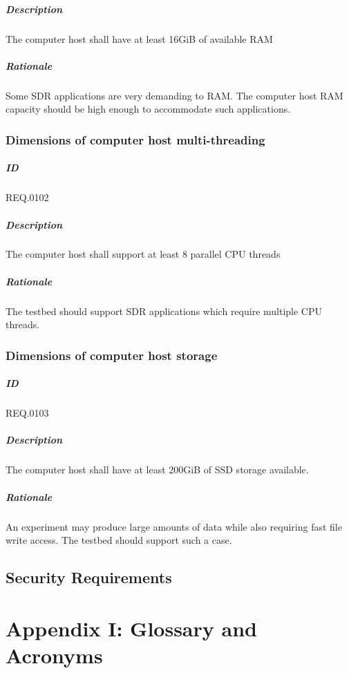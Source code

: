 \documentclass[english,titlepage,a4paper]{report}
\begin{document}
\paragraph{Description}
The computer host shall have at least 16GiB of available RAM
\paragraph{Rationale}
Some SDR applications are very demanding to RAM.
The computer host RAM capacity should be high enough to accommodate such applications.

\subsection{Dimensions of computer host multi-threading}
\paragraph{ID}
REQ.0102
\paragraph{Description}
The computer host shall support at least 8 parallel CPU threads
\paragraph{Rationale}
The testbed should support SDR applications which require multiple CPU threads.

\subsection{Dimensions of computer host storage}
\paragraph{ID}
REQ.0103
\paragraph{Description}
The computer host shall have at least 200GiB of SSD storage available.
\paragraph{Rationale}
An experiment may produce large amounts of data while also requiring fast file write access.
The testbed should support such a case.

\section{Security Requirements}


\chapter*{Appendix I: Glossary and Acronyms}

\printglossary
\printglossary[type=\acronymtype]
\end{document}
